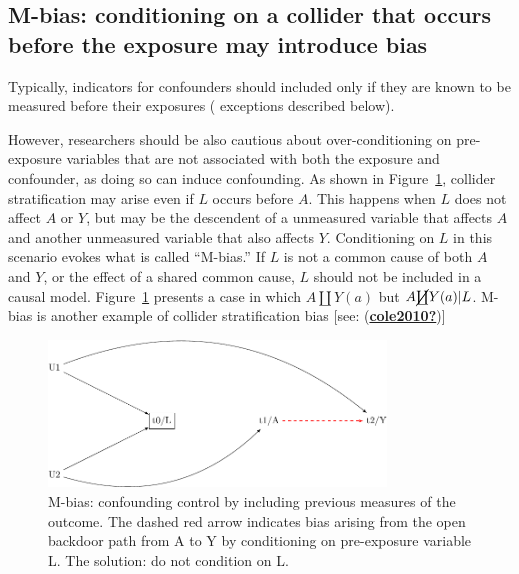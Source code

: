 \documentclass[
  singlecolumn]{report}
\begin{document}
\hypertarget{m-bias-conditioning-on-a-collider-that-occurs-before-the-exposure-may-introduce-bias}{%
\subsection{M-bias: conditioning on a collider that occurs before the
exposure may introduce
bias}\label{m-bias-conditioning-on-a-collider-that-occurs-before-the-exposure-may-introduce-bias}}

Typically, indicators for confounders should included only if they are
known to be measured before their exposures ( exceptions described
below).

However, researchers should be also cautious about over-conditioning on
pre-exposure variables that are not associated with both the exposure
and confounder, as doing so can induce confounding. As shown in
Figure~\ref{fig-m-bias}, collider stratification may arise even if \(L\)
occurs before \(A\). This happens when \(L\) does not affect \(A\) or
\(Y\), but may be the descendent of a unmeasured variable that affects
\(A\) and another unmeasured variable that also affects \(Y\).
Conditioning on \(L\) in this scenario evokes what is called ``M-bias.''
If \(L\) is not a common cause of both \(A\) and \(Y\), or the effect of
a shared common cause, \(L\) should not be included in a causal model.
Figure~\ref{fig-m-bias} presents a case in which \(A \coprod Y(a)\) but
\(A \cancel{\coprod} Y(a)| L\). M-bias is another example of collider
stratification bias {[}see:
(\protect\hyperlink{ref-cole2010}{\textbf{cole2010?}}){]}

\begin{figure}

{\centering \includegraphics[width=0.8\textwidth,height=\textheight]{causal-dags_files/figure-pdf/fig-m-bias-1.pdf}

}

\caption{\label{fig-m-bias}M-bias: confounding control by including
previous measures of the outcome. The dashed red arrow indicates bias
arising from the open backdoor path from A to Y by conditioning on
pre-exposure variable L. The solution: do not condition on L.}

\end{figure}
\end{document}
